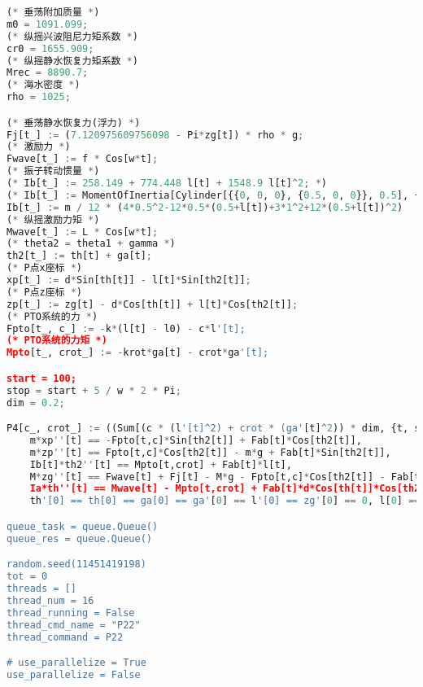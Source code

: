\begin{lstlisting}[language=Python,breaklines=true]
(* 垂荡附加质量 *)
m0 = 1091.099;
(* 纵摇兴波阻尼力矩系数 *)
cr0 = 1655.909;
(* 纵摇静水恢复力矩系数 *)
Mrec = 8890.7;
(* 海水密度 *)
rho = 1025;

(* 垂荡静水恢复力(浮力) *)
Fj[t_] := (7.120975609756098 - Pi*zg[t]) * rho * g;
(* 激励力 *)
Fwave[t_] := f * Cos[w*t];
(* 振子转动惯量 *)
(* Ib[t_] := 258.149 + 774.448 l[t] + 1548.9 l[t]^2; *)
(* Ib[t_] := MomentOfInertia[Cylinder[{{0, 0, 0}, {0.5, 0, 0}}, 0.5], {l[t] + 0.5, 0, 0}, {0, 0, 1}] *)
Ib[t_] := m / 12 * (4*0.5^2-12*0.5*(0.5+l[t])+3*1^2+12*(0.5+l[t])^2)
(* 纵摇激励力矩 *)
Mwave[t_] := L * Cos[w*t];
(* theta2 = theta1 + gamma *)
th2[t_] := th[t] + ga[t]; 
(* P点x座标 *)
xp[t_] := d*Sin[th[t]] - l[t]*Sin[th2[t]]; 
(* P点z座标 *)
zp[t_] := zg[t] - d*Cos[th[t]] + l[t]*Cos[th2[t]]; 
(* PTO系统的力 *)
Fpto[t_, c_] := -k*(l[t] - l0) - c*l'[t];
(* PTO系统的力矩 *)
Mpto[t_, crot_] := -krot*ga[t] - crot*ga'[t];

start = 100;
stop = start + 5 / w * 2 * Pi;
dim = 0.2;

P4[c_, crot_] := ((Sum[(c * (l'[t]^2) + crot * (ga'[t]^2)) * dim, {t, start, stop, dim}] /. NDSolve[{
    m*xp''[t] == -Fpto[t,c]*Sin[th2[t]] + Fab[t]*Cos[th2[t]], 
    m*zp''[t] == Fpto[t,c]*Cos[th2[t]] - m*g + Fab[t]*Sin[th2[t]], 
    Ib[t]*th2''[t] == Mpto[t,crot] + Fab[t]*l[t],
    M*zg''[t] == Fwave[t] + Fj[t] - M*g - Fpto[t,c]*Cos[th2[t]] - Fab[t]*Sin[th2[t]] - m0*zg''[t] - c0*zg'[t],
    Ia*th''[t] == Mwave[t] - Mpto[t,crot] + Fab[t]*d*Cos[th[t]]*Cos[th2[t]] - Fab[t]*d*Sin[th[t]]*Sin[th2[t]] - I0*th''[t] - cr0*th'[t] - Mrec*th[t],
    th'[0] == th[0] == ga[0] == ga'[0] == l'[0] == zg'[0] == 0, l[0] == l0-m/k, zg[0] == 0}, {th, ga, zg, l}, {t, start, stop}]) / (stop - start))'''

queue_task = queue.Queue()
queue_res = queue.Queue()

random.seed(11451419198)
tot = 0
threads = []
thread_num = 16
thread_running = False
thread_cmd_name = "P22"
thread_command = P22

# use_parallelize = True
use_parallelize = False


\end{lstlisting}
